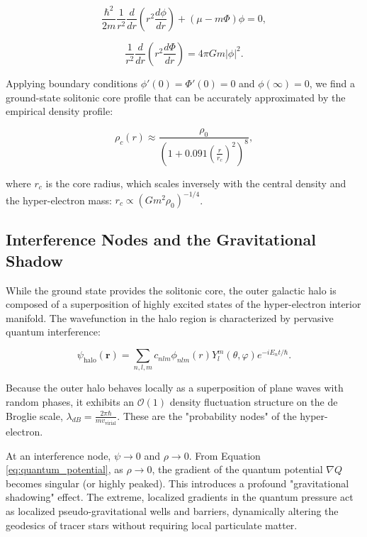 \begin{equation}
\frac{\hbar^2}{2m} \frac{1}{r^2} \frac{d}{dr} \left( r^2 \frac{d\phi}{dr} \right) + (\mu - m\Phi)\phi = 0,
\end{equation}

\begin{equation}
\frac{1}{r^2} \frac{d}{dr} \left( r^2 \frac{d\Phi}{dr} \right) = 4\pi G m |\phi|^2.
\end{equation}

Applying boundary conditions $\phi'(0) = \Phi'(0) = 0$ and $\phi(\infty) = 0$, we find a ground-state solitonic core profile that can be accurately approximated by the empirical density profile:

\begin{equation}
\rho_c(r) \approx \frac{\rho_0}{\left(1 + 0.091 \left(\frac{r}{r_c}\right)^2 \right)^8},
\end{equation}

where $r_c$ is the core radius, which scales inversely with the central density and the hyper-electron mass: $r_c \propto (G m^2 \rho_0)^{-1/4}$.

\subsection{Interference Nodes and the Gravitational Shadow}

While the ground state provides the solitonic core, the outer galactic halo is composed of a superposition of highly excited states of the hyper-electron interior manifold. The wavefunction in the halo region is characterized by pervasive quantum interference:

\begin{equation}
\psi_{\text{halo}}(\mathbf{r}) = \sum_{n,l,m} c_{nlm} \phi_{nlm}(r) Y_l^m(\theta, \varphi) e^{-iE_{n}t/\hbar}.
\end{equation}

Because the outer halo behaves locally as a superposition of plane waves with random phases, it exhibits an $\mathcal{O}(1)$ density fluctuation structure on the de Broglie scale, $\lambda_{dB} = \frac{2\pi\hbar}{mv_{\text{virial}}}$. These are the "probability nodes" of the hyper-electron.

At an interference node, $\psi \to 0$ and $\rho \to 0$. From Equation \ref{eq:quantum_potential}, as $\rho \to 0$, the gradient of the quantum potential $\nabla Q$ becomes singular (or highly peaked). This introduces a profound "gravitational shadowing" effect. The extreme, localized gradients in the quantum pressure act as localized pseudo-gravitational wells and barriers, dynamically altering the geodesics of tracer stars without requiring local particulate matter.

